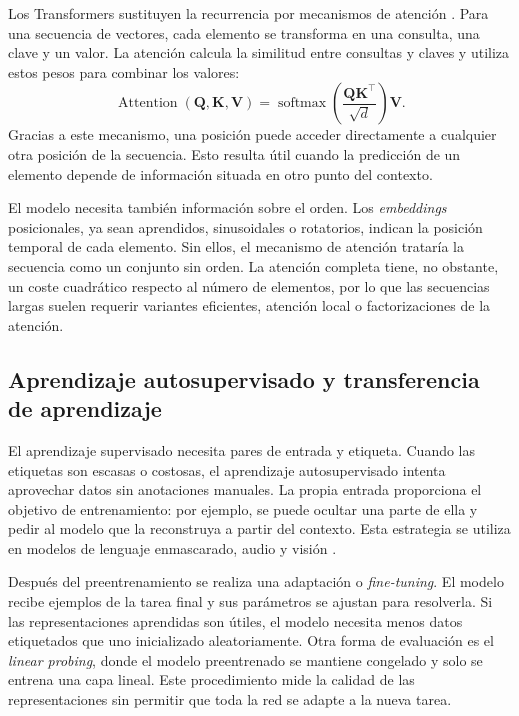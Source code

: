 Los Transformers sustituyen la recurrencia por mecanismos de atención \cite{vaswani2017attention}. Para una secuencia de vectores, cada elemento se transforma en una consulta, una clave y un valor. La atención calcula la similitud entre consultas y claves y utiliza estos pesos para combinar los valores:
\[
    \operatorname{Attention}(\mathbf{Q},\mathbf{K},\mathbf{V}) =
    \operatorname{softmax}\left(
    \frac{\mathbf{Q}\mathbf{K}^{\top}}{\sqrt{d}}
    \right)\mathbf{V}.
\]
Gracias a este mecanismo, una posición puede acceder directamente a cualquier otra posición de la secuencia. Esto resulta útil cuando la predicción de un elemento depende de información situada en otro punto del contexto.

El modelo necesita también información sobre el orden. Los \textit{embeddings} posicionales, ya sean aprendidos, sinusoidales o rotatorios, indican la posición temporal de cada elemento. Sin ellos, el mecanismo de atención trataría la secuencia como un conjunto sin orden. La atención completa tiene, no obstante, un coste cuadrático respecto al número de elementos, por lo que las secuencias largas suelen requerir variantes eficientes, atención local o factorizaciones de la atención.

\subsection{Aprendizaje autosupervisado y transferencia de aprendizaje}

El aprendizaje supervisado necesita pares de entrada y etiqueta. Cuando las etiquetas son escasas o costosas, el aprendizaje autosupervisado intenta aprovechar datos sin anotaciones manuales. La propia entrada proporciona el objetivo de entrenamiento: por ejemplo, se puede ocultar una parte de ella y pedir al modelo que la reconstruya a partir del contexto. Esta estrategia se utiliza en modelos de lenguaje enmascarado, audio y visión \cite{devlin2019bert,baevski2020wav2vec}.

Después del preentrenamiento se realiza una adaptación o \textit{fine-tuning}. El modelo recibe ejemplos de la tarea final y sus parámetros se ajustan para resolverla. Si las representaciones aprendidas son útiles, el modelo necesita menos datos etiquetados que uno inicializado aleatoriamente. Otra forma de evaluación es el \textit{linear probing}, donde el modelo preentrenado se mantiene congelado y solo se entrena una capa lineal. Este procedimiento mide la calidad de las representaciones sin permitir que toda la red se adapte a la nueva tarea.

